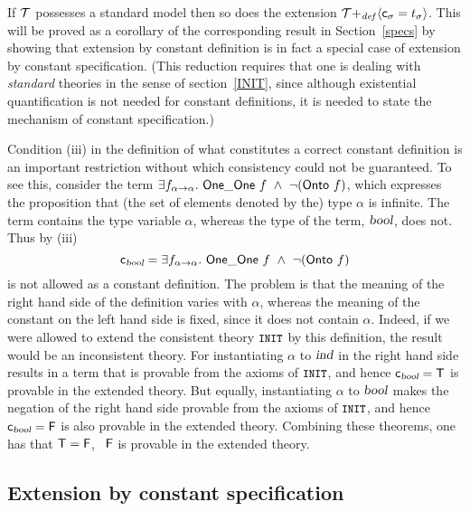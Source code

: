 If $\cal T$ possesses a standard model then so does the extension
${\cal T}{+_{\it def}}\langle{\sf c}_{\sigma}=t_{\sigma}\rangle$. This
will be proved as a corollary of the corresponding result in
Section~\ref{specs} by showing that extension by constant definition
is in fact a special case of extension by constant specification.
(This reduction requires that one is dealing with {\em standard\/}
theories in the sense of section~\ref{INIT}, since although
existential quantification is not needed for constant definitions, it
is needed to state the mechanism of constant specification.)

\medskip

 Condition (iii) in the definition of
what constitutes a correct constant definition is an important
restriction without which consistency could not be guaranteed. To see
this, consider the term $\exists f_{\alpha{\to}\alpha}.\  {\sf One\_One} \ f
\ \wedge\  \neg({\sf Onto} \ f)$, which expresses the proposition that (the set
of elements denoted by the) type $\alpha$ is infinite. The term contains the
type variable $\alpha$, whereas the type of the term, $\textsl{bool}$,
does not. Thus by (iii)
\[
{\sf c}_{\textsl{bool}} =
\exists f_{\alpha{\to}\alpha}.\  {\sf One\_One} \ f \ \wedge\  \neg({\sf Onto} \ f)
\]
is not allowed as a constant definition. The problem is that the
meaning of the right hand side of the definition varies with $\alpha$,
whereas the meaning of the constant on the left hand side is fixed,
since it does not contain $\alpha$. Indeed, if we were allowed to
extend the consistent theory $\hbox{{\small\tt INIT}}$ by this definition, the
result would be an inconsistent theory. For instantiating $\alpha$ to
$\textsl{ind}$ in the right hand side results in a term that is provable
from the axioms of $\hbox{{\small\tt INIT}}$, and hence ${\sf c}_{\textsl{bool}}={\sf T}$ is
provable in the extended theory. But equally, instantiating $\alpha$
to $\textsl{bool}$ makes the negation of the right hand side provable
from the axioms of $\hbox{{\small\tt INIT}}$, and hence ${\sf c}_{\textsl{bool}}={\sf F}$ is
also provable in the extended theory. Combining these theorems, one
has that ${\sf T}={\sf F}$, \ie\ ${\sf F}$ is provable in the extended theory.

\subsection{Extension by constant specification}
\label{specs}

